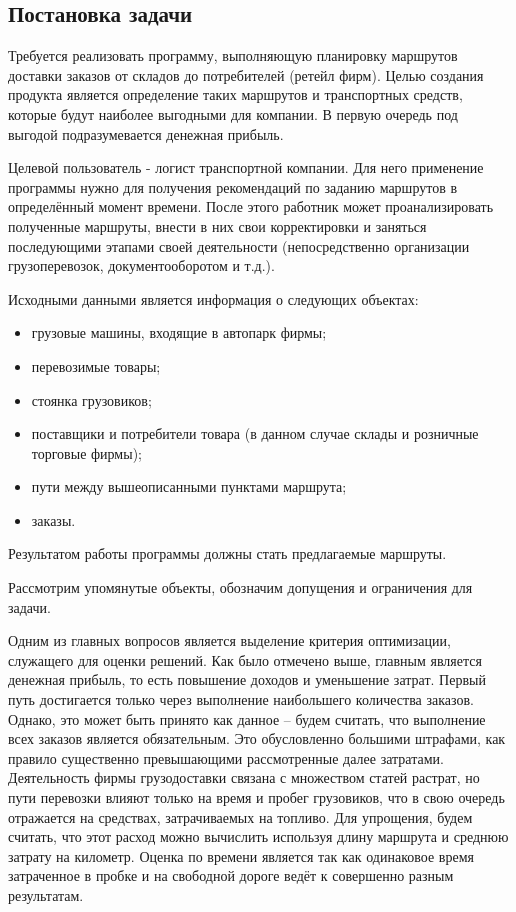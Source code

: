 \subsection{Постановка задачи}
	Требуется реализовать программу, выполняющую планировку маршрутов доставки заказов от складов до потребителей (ретейл фирм). Целью создания продукта является определение таких маршрутов и транспортных средств, которые будут наиболее выгодными для компании. В первую очередь под выгодой подразумевается денежная прибыль.
	
	Целевой пользователь - логист транспортной компании. Для него применение программы нужно для получения рекомендаций по заданию маршрутов в определённый момент времени. После этого работник может проанализировать полученные маршруты, внести в них свои корректировки и заняться последующими этапами своей деятельности (непосредственно организации грузоперевозок, документооборотом и т.д.).
	
	Исходными данными является информация о следующих объектах:
	\begin{itemize}
		\item грузовые машины, входящие в автопарк фирмы;
		\item перевозимые товары;
		\item стоянка грузовиков;
		\item поставщики и потребители товара (в данном случае склады и розничные торговые фирмы);
		\item пути между вышеописанными пунктами маршрута;
		\item заказы.
	\end{itemize}

	Результатом работы программы должны стать предлагаемые маршруты.
	
	Рассмотрим упомянутые объекты, обозначим допущения и ограничения для задачи.
	
	Одним из главных вопросов является выделение критерия оптимизации, служащего для оценки решений. Как было отмечено выше, главным является денежная прибыль, то есть повышение доходов и уменьшение затрат.   
	Первый путь достигается только через выполнение наибольшего количества заказов. Однако, это может быть принято как данное -- будем считать, что выполнение всех заказов является обязательным. Это обусловленно большими штрафами, как правило существенно превышающими рассмотренные далее затратами.   
	Деятельность фирмы грузодоставки связана с множеством статей растрат, но пути перевозки влияют только на время и пробег грузовиков, что в свою очередь отражается на средствах, затрачиваемых на топливо. Для упрощения, будем считать, что этот расход можно вычислить используя длину маршрута и среднюю затрату на километр. Оценка по времени является так как одинаковое время затраченное в пробке и на свободной дороге ведёт к совершенно разным результатам.
	
